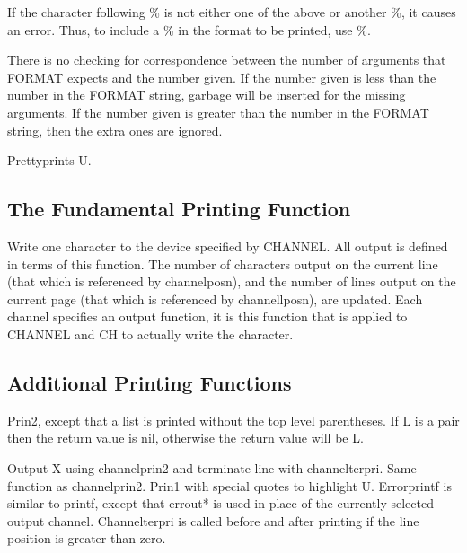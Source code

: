     If  the character following \% is not either one of the above
    or another \%, it  causes an error.  Thus, to include a \%  in
    the format to be printed, use \%.

    There  is  no checking for correspondence between the number
    of arguments that FORMAT expects and the number given.    If
    the  number  given  is  less  than  the number in the FORMAT
    string, garbage will be inserted for the missing  arguments.
    If the number given is greater than the number in the FORMAT
    string, then the extra ones are ignored.


{    Prettyprints U.
}

\subsection{The Fundamental Printing Function}

{}
{    
    Write one character to the device specified by CHANNEL.  All
    output  is defined in terms of this function.  The number of
    characters  output  on  the  current  line  (that  which  is
    referenced  by  channelposn), and the number of lines output
    on  the  current  page  (that   which   is   referenced   by
    channellposn),  are  updated.   Each  channel  specifies  an
    output function,  it is this function  that  is  applied  to
    CHANNEL and CH to actually write the character.
}

\subsection{Additional Printing Functions}

{    Prin2,  except  that a list is printed without the top level
    parentheses.  If L is a pair then the return value  is  nil,
    otherwise the return value will be L.  }

{}
{    Output   X   using  channelprin2  and  terminate  line  with
    channelterpri.
}
{}
{    Same function as channelprin2.
}
{    Prin1 with special quotes to highlight U.
}
{    Errorprintf is similar to  printf, except  that  errout*  is
    used  in  place  of  the  currently selected output channel.
    Channelterpri is called before and  after  printing  if  the
    line position is greater than zero.  }

